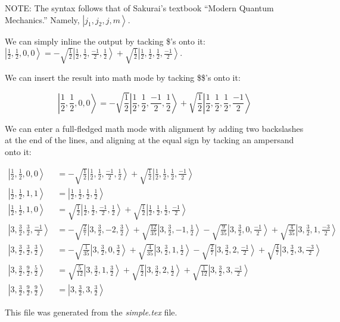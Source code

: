 \documentclass{report}
\newcommand{\ket}[1]{\left| #1 \right>} %
\begin{document}
NOTE: The syntax follows that of Sakurai's textbook ``Modern Quantum Mechanics.'' Namely, $\ket{ j_{1}, j_{2}, j, m}.$

We can simply inline the output by tacking \$'s onto it:
$ \ket{ \frac{1}{2} ,  \frac{1}{2} ,  0 ,  0  } =  - \sqrt{  \frac{1}{2}  } \ket{ \frac{1}{2} ,  \frac{1}{2} ,  \frac{-1}{2} ,  \frac{1}{2}  } + \sqrt{  \frac{1}{2}  } \ket{ \frac{1}{2} ,  \frac{1}{2} ,  \frac{1}{2} ,  \frac{-1}{2}  }$.


We can insert the result into math mode by tacking \$\$'s onto it:

$$\ket{ \frac{1}{2} ,  \frac{1}{2} ,  0 ,  0  } =  - \sqrt{  \frac{1}{2}  } \ket{ \frac{1}{2} ,  \frac{1}{2} ,  \frac{-1}{2} ,  \frac{1}{2}  } + \sqrt{  \frac{1}{2}  } \ket{ \frac{1}{2} ,  \frac{1}{2} ,  \frac{1}{2} ,  \frac{-1}{2}  }$$



We can enter a full-fledged math mode with alignment by adding two backslashes at the end of the lines, and aligning at the equal sign by tacking an ampersand onto it:

\begin{align*}
\ket{ \frac{1}{2} ,  \frac{1}{2} ,  0 ,  0  } &=  - \sqrt{  \frac{1}{2}  } \ket{ \frac{1}{2} ,  \frac{1}{2} ,  \frac{-1}{2} ,  \frac{1}{2}  } + \sqrt{  \frac{1}{2}  } \ket{ \frac{1}{2} ,  \frac{1}{2} ,  \frac{1}{2} ,  \frac{-1}{2}  } \\
\ket{ \frac{1}{2} ,  \frac{1}{2} ,  1 ,  1  } &=  \ket{ \frac{1}{2} ,  \frac{1}{2} ,  \frac{1}{2} ,  \frac{1}{2}  } \\
\ket{ \frac{1}{2} ,  \frac{1}{2} ,  1 ,  0  } &=  \sqrt{  \frac{1}{2}  } \ket{ \frac{1}{2} ,  \frac{1}{2} ,  \frac{-1}{2} ,  \frac{1}{2}  } + \sqrt{  \frac{1}{2}  } \ket{ \frac{1}{2} ,  \frac{1}{2} ,  \frac{1}{2} ,  \frac{-1}{2}  } \\
\ket{ 3 ,  \frac{3}{2} ,  \frac{3}{2} ,  \frac{-1}{2}  } &=  - \sqrt{  \frac{2}{7}  } \ket{ 3 ,  \frac{3}{2} ,  -2 ,  \frac{3}{2}  } + \sqrt{  \frac{12}{35}  } \ket{ 3 ,  \frac{3}{2} ,  -1 ,  \frac{1}{2}  } - \sqrt{  \frac{9}{35}  } \ket{ 3 ,  \frac{3}{2} ,  0 ,  \frac{-1}{2}  } + \sqrt{  \frac{4}{35}  } \ket{ 3 ,  \frac{3}{2} ,  1 ,  \frac{-3}{2}  } \\
\ket{ 3 ,  \frac{3}{2} ,  \frac{3}{2} ,  \frac{3}{2}  } &=  - \sqrt{  \frac{1}{35}  } \ket{ 3 ,  \frac{3}{2} ,  0 ,  \frac{3}{2}  } + \sqrt{  \frac{4}{35}  } \ket{ 3 ,  \frac{3}{2} ,  1 ,  \frac{1}{2}  } - \sqrt{  \frac{2}{7}  } \ket{ 3 ,  \frac{3}{2} ,  2 ,  \frac{-1}{2}  } + \sqrt{  \frac{4}{7}  } \ket{ 3 ,  \frac{3}{2} ,  3 ,  \frac{-3}{2}  } \\
\ket{ 3 ,  \frac{3}{2} ,  \frac{9}{2} ,  \frac{5}{2}  } &=  \sqrt{  \frac{5}{12}  } \ket{ 3 ,  \frac{3}{2} ,  1 ,  \frac{3}{2}  } + \sqrt{  \frac{1}{2}  } \ket{ 3 ,  \frac{3}{2} ,  2 ,  \frac{1}{2}  } + \sqrt{  \frac{1}{12}  } \ket{ 3 ,  \frac{3}{2} ,  3 ,  \frac{-1}{2}  } \\
\ket{ 3 ,  \frac{3}{2} ,  \frac{9}{2} ,  \frac{9}{2}  } &=  \ket{ 3 ,  \frac{3}{2} ,  3 ,  \frac{3}{2}  }
\end{align*}


This file was generated from the \emph{simple.tex} file.
\end{document}
